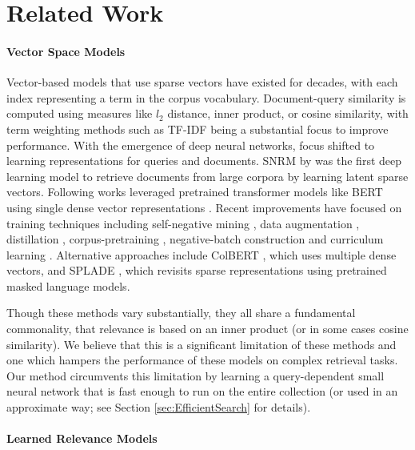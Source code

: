 \documentclass[sigconf,]{acmart}
\begin{document}
\section{Related Work}
\paragraph{\textbf{Vector Space Models}}

Vector-based models that use sparse vectors have existed for decades, with each index representing a term in the corpus vocabulary. Document-query similarity is computed using measures like $l_2$ distance, inner product, or cosine similarity, with term weighting methods such as TF-IDF being a substantial focus to improve performance. With the emergence of deep neural networks, focus shifted to learning representations for queries and documents. SNRM by \citet{SNRM} was the first deep learning model to retrieve documents from large corpora by learning latent sparse vectors. Following works leveraged pretrained transformer models like BERT \cite{BERT} using single dense vector representations \cite{DPR}. Recent improvements have focused on training techniques including self-negative mining \cite{ANCE, RocketQA, RANCE, adore}, data augmentation \cite{RocketQA, DRAGON}, distillation \cite{MarginMSE, DRAGON, TCT-ColBERT}, corpus-pretraining \cite{CoCondensor, Contriever, RetroMAE,b-prop}, negative-batch construction \cite{TAS-B} and curriculum learning \cite{CL-DRD,prod}. Alternative approaches include ColBERT \cite{ColBERT_v1}, which uses multiple dense vectors, and SPLADE \cite{SPLADE}, which revisits sparse representations using pretrained masked language models.

Though these methods vary substantially, they all share a fundamental commonality, that relevance is based on an inner product (or in some cases cosine similarity). We believe that this is a significant limitation of these methods and one which hampers the performance of these models on complex retrieval tasks. Our method circumvents this limitation by learning a query-dependent small neural network that is fast enough to run on the entire collection (or used in an approximate way; see Section \ref{sec:EfficientSearch} for details).

\paragraph{\textbf{Learned Relevance Models}}
\end{document}
